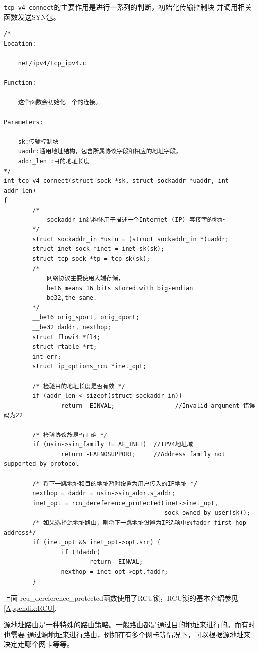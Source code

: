             \texttt{tcp_v4_connect}的主要作用是进行一系列的判断，初始化传输控制块
            并调用相关函数发送SYN包。
\begin{verbatim}
/*
Location:

    net/ipv4/tcp_ipv4.c

Function:

    这个函数会初始化一个的连接。

Parameters:

    sk:传输控制块
    uaddr:通用地址结构，包含所属协议字段和相应的地址字段。
    addr_len :目的地址长度
*/
int tcp_v4_connect(struct sock *sk, struct sockaddr *uaddr, int addr_len)
{
        /*
            sockaddr_in结构体用于描述一个Internet (IP) 套接字的地址     
        */
        struct sockaddr_in *usin = (struct sockaddr_in *)uaddr; 
        struct inet_sock *inet = inet_sk(sk);
        struct tcp_sock *tp = tcp_sk(sk);
        /*
            网络协议主要使用大端存储，
            be16 means 16 bits stored with big-endian
            be32,the same.
        */
        __be16 orig_sport, orig_dport;
        __be32 daddr, nexthop;                  
        struct flowi4 *fl4;
        struct rtable *rt;
        int err;
        struct ip_options_rcu *inet_opt;

        /* 检验目的地址长度是否有效 */
        if (addr_len < sizeof(struct sockaddr_in))
                return -EINVAL;                 //Invalid argument 错误码为22

        /* 检验协议族是否正确 */
        if (usin->sin_family != AF_INET)  //IPV4地址域
                return -EAFNOSUPPORT;     //Address family not supported by protocol

        /* 将下一跳地址和目的地址暂时设置为用户传入的IP地址 */
        nexthop = daddr = usin->sin_addr.s_addr;
        inet_opt = rcu_dereference_protected(inet->inet_opt,
                                             sock_owned_by_user(sk));
        /* 如果选择源地址路由，则将下一跳地址设置为IP选项中的faddr-first hop address*/
        if (inet_opt && inet_opt->opt.srr) {
                if (!daddr)
                        return -EINVAL;
                nexthop = inet_opt->opt.faddr;
        }
\end{verbatim}

            上面    rcu\_dereference\_protected函数使用了RCU锁，RCU锁的基本介绍参见\ref{Appendix:RCU}.

            源地址路由是一种特殊的路由策略。一般路由都是通过目的地址来进行的。而有时也需要
            通过源地址来进行路由，例如在有多个网卡等情况下，可以根据源地址来决定走哪个网卡等等。


